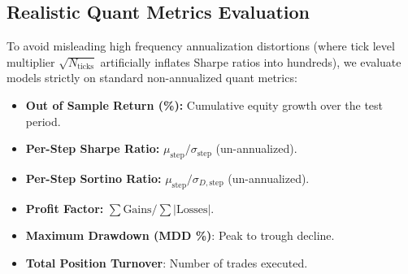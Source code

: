 \documentclass[conference]{IEEEtran}
\begin{document}
\subsection{Realistic Quant Metrics Evaluation}
To avoid misleading high frequency annualization distortions (where tick level multiplier $\sqrt{N_{\text{ticks}}}$ artificially inflates Sharpe ratios into hundreds), we evaluate models strictly on standard non-annualized quant metrics:
\begin{itemize}
    \item \textbf{Out of Sample Return (\%):} Cumulative equity growth over the test period.
    \item \textbf{Per-Step Sharpe Ratio:} $\mu_{\text{step}} / \sigma_{\text{step}}$ (un-annualized).
    \item \textbf{Per-Step Sortino Ratio:} $\mu_{\text{step}} / \sigma_{D,\text{step}}$ (un-annualized).
    \item \textbf{Profit Factor:} $\sum \text{Gains} / \sum |\text{Losses}|$.
    \item \textbf{Maximum Drawdown (MDD \%)}: Peak to trough decline.
    \item \textbf{Total Position Turnover}: Number of trades executed.
\end{itemize}

\begin{table}[t]
\centering
\caption{OUT OF SAMPLE QUANTITATIVE TRADING BENCHMARK (5,000 TICKS, 1.0 BPS FEE PER TURNOVER, 5 SEEDS, MEAN $\pm$ STD)}
\label{tab:benchmark}
\end{table}
\end{document}
